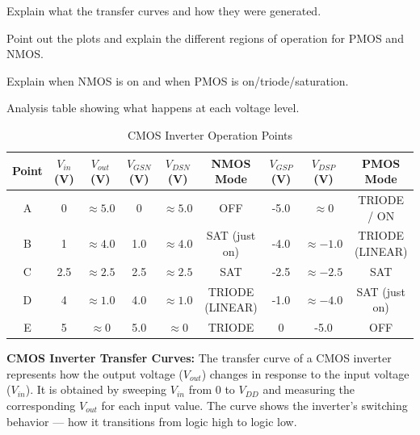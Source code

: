 \documentclass[a4paper,12pt]{article}
\begin{document}
Explain what the transfer curves and how they were generated.

Point out the plots and explain the different regions of operation for PMOS and NMOS.

Explain when NMOS is on and when PMOS is on/triode/saturation.

Analysis table showing what happens at each voltage level. 

\begin{table}[h!]
\centering
\begin{tabular}{|c|c|c|c|c|c|c|c|c|}
\hline
\textbf{Point} & \textbf{$V_{in}$ (V)} & \textbf{$V_{out}$ (V)} & \textbf{$V_{GSN}$ (V)} & \textbf{$V_{DSN}$ (V)} & \textbf{NMOS Mode} & \textbf{$V_{GSP}$ (V)} & \textbf{$V_{DSP}$ (V)} & \textbf{PMOS Mode} \\ \hline
A & 0 & $\approx 5.0$ & 0 & $\approx 5.0$ & OFF & -5.0 & $\approx 0$ & TRIODE / ON\\ \hline
B & 1 & $\approx 4.0$ & 1.0 & $\approx 4.0$ & SAT (just on) & -4.0 & $\approx -1.0$ & TRIODE (LINEAR) \\ \hline
C & 2.5 & $\approx 2.5$ & 2.5 & $\approx 2.5$ & SAT & -2.5 & $\approx -2.5$ & SAT \\ \hline
D & 4 & $\approx 1.0$ & 4.0 & $\approx 1.0$ & TRIODE (LINEAR) & -1.0 & $\approx -4.0$ & SAT (just on) \\ \hline
E & 5 & $\approx 0$ & 5.0 & $\approx 0$ & TRIODE & 0 & -5.0 & OFF \\ \hline
\end{tabular}
\caption{CMOS Inverter Operation Points}
\end{table}

\textbf{CMOS Inverter Transfer Curves:}  
The transfer curve of a CMOS inverter represents how the output voltage ($V_{out}$) changes in response to the input voltage ($V_{in}$).  
It is obtained by sweeping $V_{in}$ from $0$ to $V_{DD}$ and measuring the corresponding $V_{out}$ for each input value.  
The curve shows the inverter's switching behavior — how it transitions from logic high to logic low.
\end{document}
